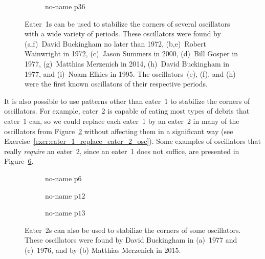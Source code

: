 \begin{figure}[!htb]
	\begin{subfigure}{.33\textwidth}%
		\centering
		\caption{no-name p36}
		\label{fig:period_36}
	\end{subfigure}
	\caption{Eater~1s can be used to stabilize the corners of several oscillators with a wide variety of periods. These oscillators were found by (a,f)~David Buckingham no later than 1972, (b,e)~Robert Wainwright in 1972, (c)~Jason Summers in 2000, (d)~Bill Gosper in 1977, (g)~Matthias Merzenich in 2014, (h)~David Buckingham in 1977, and (i)~Noam Elkies in 1995. The oscillators~(e), (f), and (h) were the first known oscillators of their respective periods.}
	\label{fig:eater_1_oscillators}
\end{figure}

It is also possible to use patterns other than eater~1 to stabilize the corners of oscillators. For example, eater~2 is capable of eating most types of debris that eater~1 can, so we could replace each eater~1 by an eater~2 in many of the oscillators from Figure~\ref{fig:eater_1_oscillators} without affecting them in a significant way (see Exercise~\ref{exer:eater_1_replace_eater_2_osc}). Some examples of oscillators that really \emph{require} an eater~2, since an eater~1 does not suffice, are presented in Figure~\ref{fig:eater_2_oscillators}.

\begin{figure}[!htb]
	\centering
	\begin{subfigure}{.3\textwidth}
		\centering
		\caption{no-name p$6$} %
		\label{fig:eater_2_p6}
	\end{subfigure}%
	\begin{subfigure}{.3\textwidth}
		\centering
		\caption{no-name p$12$} %
		\label{fig:eater_2_p12}
	\end{subfigure}%
	\begin{subfigure}{.36\textwidth}
		\centering
		\caption{no-name p$13$} %
		\label{fig:eater_2_p13}
	\end{subfigure}%
	\caption{Eater~2s can also be used to stabilize the corners of some oscillators. These oscillators were found by David Buckingham in (a)~1977 and (c)~1976, and by (b) Matthias Merzenich in 2015.}
	\label{fig:eater_2_oscillators}
\end{figure}

